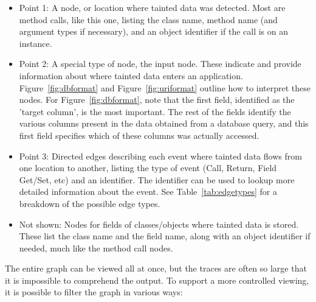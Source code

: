\documentclass[msc,oneside]{ubcthesis}
\begin{document}
\begin{itemize}
\item Point 1: A node, or location where tainted data was detected. Most are method calls, like this one, listing the class name, method name (and argument types if necessary), and an object identifier if the call is on an instance.
\item Point 2: A special type of node, the input node. These indicate and provide information about where tainted data enters an application. Figure~\ref{fig:dbformat} and Figure~\ref{fig:uriformat} outline how to interpret these nodes. For Figure~\ref{fig:dbformat}, note that the first field, identified as the 'target column', is the most important. The rest of the fields identify the various columns present in the data obtained from a database query, and this first field specifies which of these columns was actually accessed.  
\item Point 3: Directed edges describing each event where tainted data flows from one location to another, listing the type of event (Call, Return, Field Get/Set, etc) and an identifier. The identifier can be used to lookup more detailed information about the event. See Table~\ref{tab:edgetypes} for a breakdown of the possible edge types.
\item Not shown: Nodes for fields of classes/objects where tainted data is stored. These list the class name and the field name, along with an object identifier if needed, much like the method call nodes.
\end{itemize}

The entire graph can be viewed all at once, but the traces are often so large that it is impossible to comprehend the output. To support a more controlled viewing, it is possible to filter the graph in various ways:
\end{document}
